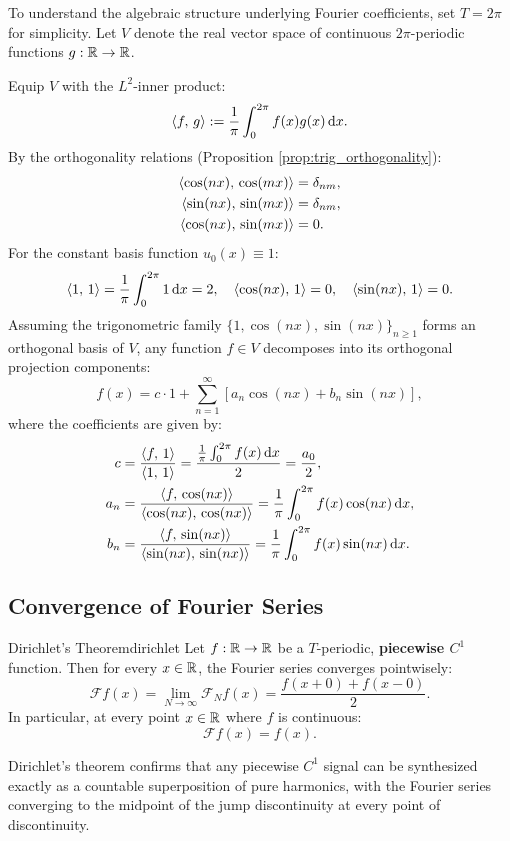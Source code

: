 To understand the algebraic structure underlying Fourier coefficients, set $T = 2\pi$ for simplicity. Let $V$ denote the real vector space of continuous $2\pi$-periodic functions $g: \mathbb{R} \to \mathbb{R}$.

Equip $V$ with the $L^2$-inner product:
\[
\left\langle f, \, g \right\rangle := \frac{1}{\pi} \int_0^{2\pi} f(x) g(x) \,\mathrm{d}x.
\]
By the orthogonality relations (Proposition \ref{prop:trig_orthogonality}):
\begin{align*}
\left\langle \cos(nx), \, \cos(mx) \right\rangle &= \delta_{nm}, \\
\left\langle \sin(nx), \, \sin(mx) \right\rangle &= \delta_{nm}, \\
\left\langle \cos(nx), \, \sin(mx) \right\rangle &= 0.
\end{align*}
For the constant basis function $u_0(x) \equiv 1$:
\[
\left\langle 1, \, 1 \right\rangle = \frac{1}{\pi} \int_0^{2\pi} 1 \,\mathrm{d}x = 2, \quad \left\langle \cos(nx), \, 1 \right\rangle = 0, \quad \left\langle \sin(nx), \, 1 \right\rangle = 0.
\]
Assuming the trigonometric family $\{1, \cos(nx), \sin(nx)\}_{n \ge 1}$ forms an orthogonal basis of $V$, any function $f \in V$ decomposes into its orthogonal projection components:
\[
f(x) = c \cdot 1 + \sum_{n=1}^\infty \left[ a_n \cos(nx) + b_n \sin(nx) \right],
\]
where the coefficients are given by:
\begin{align*}
c &= \frac{\left\langle f, \, 1 \right\rangle}{\left\langle 1, \, 1 \right\rangle} = \frac{\frac{1}{\pi} \int_0^{2\pi} f(x) \,\mathrm{d}x}{2} = \frac{a_0}{2}, \\
a_n &= \frac{\left\langle f, \, \cos(nx) \right\rangle}{\left\langle \cos(nx), \, \cos(nx) \right\rangle} = \frac{1}{\pi} \int_0^{2\pi} f(x) \cos(nx) \,\mathrm{d}x, \\
b_n &= \frac{\left\langle f, \, \sin(nx) \right\rangle}{\left\langle \sin(nx), \, \sin(nx) \right\rangle} = \frac{1}{\pi} \int_0^{2\pi} f(x) \sin(nx) \,\mathrm{d}x.
\end{align*}

\subsection{Convergence of Fourier Series}

\begin{theoreme}{Dirichlet's Theorem}{dirichlet}
Let $f: \mathbb{R} \to \mathbb{R}$ be a $T$-periodic, \textbf{piecewise $C^1$} function. Then for every $x \in \mathbb{R}$, the Fourier series converges pointwisely:
\[
\mathcal{F}f(x) = \lim_{N \to \infty} \mathcal{F}_N f(x) = \frac{f(x+0) + f(x-0)}{2}.
\]
In particular, at every point $x \in \mathbb{R}$ where $f$ is continuous:
\[
\mathcal{F}f(x) = f(x).
\]
\end{theoreme}

\begin{remarque}
Dirichlet's theorem confirms that any piecewise $C^1$ signal can be synthesized exactly as a countable superposition of pure harmonics, with the Fourier series converging to the midpoint of the jump discontinuity at every point of discontinuity.
\end{remarque}

